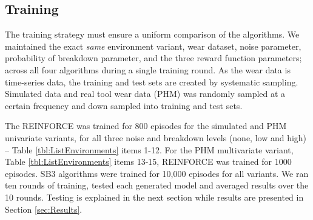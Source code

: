 \documentclass[a4paper, 12pt]{article}
\begin{document}
\subsection{Training}
The training strategy must ensure a uniform comparison of the algorithms. We maintained the exact \textit{same} environment variant, wear dataset, noise parameter, probability of breakdown parameter, and the three reward function parameters; across all four algorithms during a single training round. %
As the wear data is time-series data, the training and test sets are created by systematic sampling. Simulated data and real tool wear data (PHM) was randomly sampled at a certain frequency and down sampled into training and test sets.

The REINFORCE was trained for 800 episodes for the simulated and PHM univariate variants, for all three noise and breakdown levels (none, low and high) -- Table \ref{tbl:ListEnvironments} items 1-12. For the PHM multivariate variant, Table \ref{tbl:ListEnvironments} items 13-15, REINFORCE was trained for 1000 episodes. SB3 algorithms were trained for 10,000 episodes for all variants. We ran ten rounds of training, tested each generated model and averaged results over the 10 rounds. Testing is explained in the next section while results are presented in Section \ref{sec:Results}.
\end{document}
